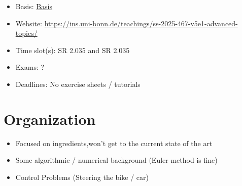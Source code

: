 \begin{tcolorbox}[enhanced,breakable,
	title=General Information,frame style={color=mycolor}]
    \begin{itemize}
        \item Basis: \href{https://basis.uni-bonn.de/qisserver/rds?state=verpublish&status=init&vmfile=no&publishid=261270&moduleCall=webInfo&publishConfFile=webInfo&publishSubDir=veranstaltung}{Basis}
        \item Website: \href{https://ins.uni-bonn.de/teachings/ss-2025-467-v5e1-advanced-topics/}{https://ins.uni-bonn.de/teachings/ss-2025-467-v5e1-advanced-topics/}
        \item Time slot(s):  SR 2.035 and  SR 2.035
        \item Exams: ?
        \item Deadlines: No exercise sheets / tutorials
    \end{itemize}
\end{tcolorbox}

\section{Organization}

\begin{itemize}
    \item Focused on ingredients,won't get to the current state of the art
    \item Some algorithmic / numerical background (Euler method is fine)
    \item Control Problems (Steering the bike / car)
\end{itemize}


